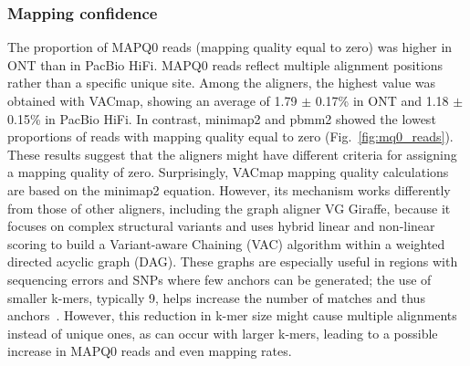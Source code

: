 \documentclass[12pt, letterpaper]{article}
\begin{document}
\subsubsection{Mapping confidence}
The proportion of MAPQ0 reads (mapping quality equal to zero) was higher in ONT than in PacBio HiFi. MAPQ0 reads reflect multiple alignment positions rather than a specific unique site. Among the aligners, the highest value was obtained with VACmap, showing an average of 1.79 $\pm$ 0.17\% in ONT and 1.18 $\pm$ 0.15\% in PacBio HiFi. In contrast, minimap2 and pbmm2 showed the lowest proportions of reads with mapping quality equal to zero (Fig.~\ref{fig:mq0_reads}). These results suggest that the aligners might have different criteria for assigning a mapping quality of zero. Surprisingly, VACmap mapping quality calculations are based on the minimap2 equation. However, its mechanism works differently from those of other aligners, including the graph aligner VG Giraffe, because it focuses on complex structural variants and uses hybrid linear and non-linear scoring to build a Variant-aware Chaining (VAC) algorithm within a weighted directed acyclic graph (DAG). These graphs are especially useful in regions with sequencing errors and SNPs where few anchors can be generated; the use of smaller k-mers, typically 9, helps increase the number of matches and thus anchors~\cite{vacmap2025}. However, this reduction in k-mer size might cause multiple alignments instead of unique ones, as can occur with larger k-mers, leading to a possible increase in MAPQ0 reads and even mapping rates.
\end{document}
